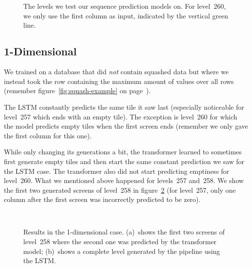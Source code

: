 \begin{figure}[t]
  \centering
  \\
  \\
  \caption{The levels we test our sequence prediction models on. For
    level~260, we only use the first column as input, indicated by the
    vertical green line.}
  \label{fig:predlevels}
\end{figure}

\subsection{1-Dimensional}

We trained on a database that did \emph{not} contain squashed data but
where we instead took the row containing the maximum amount of values
over all rows (remember figure~\ref{fig:squash-example} on
page~\pageref{fig:squash-example}).

The LSTM constantly predicts the same tile it saw last (especially
noticeable for level~257 which ends with an empty tile). The exception
is level~260 for which the model predicts empty tiles when the first
screen ends (remember we only gave the first column for this one).

While only changing its generations a bit, the transformer learned to
sometimes first generate empty tiles and then start the same constant
prediction we saw for the LSTM case. The transformer also did not
start predicting emptiness for level~260. What we mentioned above
happened for levels~257 and~258. We show the first two generated
screens of level~258 in figure~\ref{fig:1d-results} (for level~257,
only one column after the first screen was incorrectly predicted to be
zero).
\medskip

\begin{figure}[t]
  \centering
  \\
  \caption{Results in the 1-dimensional case. (a)~shows the first two
    screens of level~258 where the second one was predicted by the
    transformer model; (b)~shows a complete level generated by the
    pipeline using the LSTM.}
  \label{fig:1d-results}
\end{figure}

